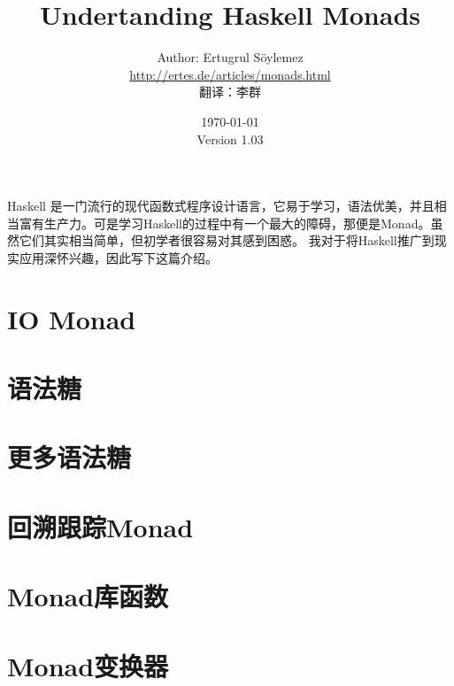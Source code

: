 \documentclass[11pt]{article} %
\title{Undertanding Haskell Monads}
\author{Author: Ertugrul S\"oylemez\\
\url{http://ertes.de/articles/monads.html}\\[2mm]
翻译：李群}
\date{\today\\
Version 1.03}
\begin{document}
\maketitle

Haskell 是一门流行的现代函数式程序设计语言，它易于学习，语法优美，并且相当富有生产力。可是学习Haskell的过程中有一个最大的障碍，那便是Monad。虽然它们其实相当简单，但初学者很容易对其感到困惑。 我对于将Haskell推广到现实应用深怀兴趣，因此写下这篇介绍。

\clearpage
\renewcommand\contentsname{目录}
\tableofcontents
\clearpage

\clearpage
\clearpage
\clearpage
\clearpage
\clearpage
\clearpage

\section{IO Monad}
\section{语法糖}
\section{更多语法糖}
\section{回溯跟踪Monad}
\section{Monad库函数}
\section{Monad变换器}
\end{document}
